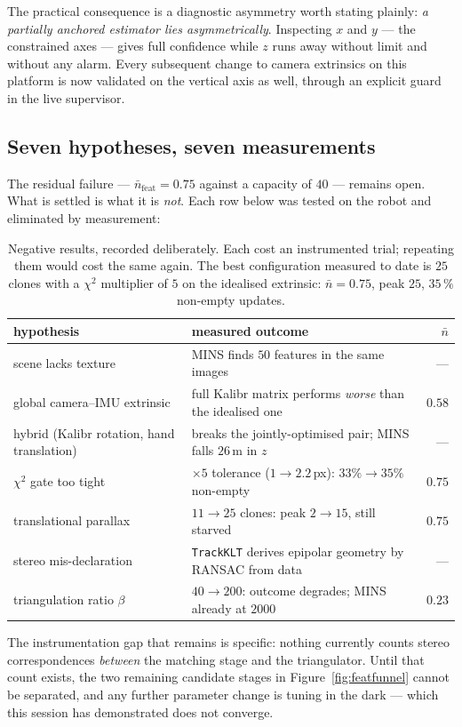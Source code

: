 The practical consequence is a diagnostic asymmetry worth stating plainly:
\emph{a partially anchored estimator lies asymmetrically}. Inspecting $x$ and
$y$ --- the constrained axes --- gives full confidence while $z$ runs away
without limit and without any alarm. Every subsequent change to camera
extrinsics on this platform is now validated on the vertical axis as well,
through an explicit guard in the live supervisor.

\subsection{Seven hypotheses, seven measurements}
\label{sec:sevenhyp}

The residual failure --- $\bar{n}_{\mathrm{feat}} = 0.75$ against a capacity
of $40$ --- remains open. What is settled is what it is \emph{not}. Each row
below was tested on the robot and eliminated by measurement:

\begin{table}[htbp]
\centering
\small
\begin{tabular}{@{}p{47mm}p{52mm}r@{}}
\toprule
hypothesis & measured outcome & $\bar{n}$ \\
\midrule
scene lacks texture
  & MINS finds $50$ features in the same images
  & --- \\
global camera--IMU extrinsic
  & full Kalibr matrix performs \emph{worse} than the idealised one
  & $0.58$ \\
hybrid (Kalibr rotation, hand translation)
  & breaks the jointly-optimised pair; MINS falls $26$\,m in $z$
  & --- \\
$\chi^2$ gate too tight
  & $\times 5$ tolerance ($1 \to 2.2$\,px): $33\% \to 35\%$ non-empty
  & $0.75$ \\
translational parallax
  & $11 \to 25$ clones: peak $2 \to 15$, still starved
  & $0.75$ \\
stereo mis-declaration
  & \texttt{TrackKLT} derives epipolar geometry by RANSAC from data
  & --- \\
triangulation ratio $\beta$
  & $40 \to 200$: outcome degrades; MINS already at $2000$
  & $0.23$ \\
\bottomrule
\end{tabular}
\caption[Eliminated explanations for feature starvation]{Negative results,
recorded deliberately. Each cost an instrumented trial; repeating them would
cost the same again. The best configuration measured to date is
$25$ clones with a $\chi^2$ multiplier of $5$ on the idealised extrinsic:
$\bar{n} = 0.75$, peak $25$, $35\,\%$ non-empty updates.}
\label{tab:sevenhyp}
\end{table}

The instrumentation gap that remains is specific: nothing currently counts
stereo correspondences \emph{between} the matching stage and the triangulator.
Until that count exists, the two remaining candidate stages in
Figure~\ref{fig:featfunnel} cannot be separated, and any further parameter
change is tuning in the dark --- which this session has demonstrated does not
converge.
